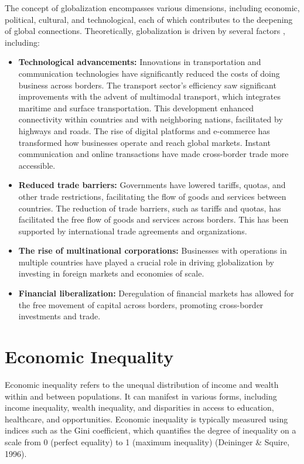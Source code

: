 The concept of globalization encompasses various dimensions, including economic, political, cultural, and technological, each of which contributes to the deepening of global connections. Theoretically, globalization is driven by several factors \citep{thompson2023factors}, including:
\begin{itemize}
    \item \textbf{Technological advancements:} Innovations in transportation and communication technologies have significantly reduced the costs of doing business across borders. The transport sector’s efficiency saw significant improvements with the advent of multimodal transport, which integrates maritime and surface transportation. This development enhanced connectivity within countries and with neighboring nations, facilitated by highways and roads. The rise of digital platforms and e-commerce has transformed how businesses operate and reach global markets. Instant communication and online transactions have made cross-border trade more accessible.
    \item \textbf{Reduced trade barriers:} Governments have lowered tariffs, quotas, and other trade restrictions, facilitating the flow of goods and services between countries. The reduction of trade barriers, such as tariffs and quotas, has facilitated the free flow of goods and services across borders. This has been supported by international trade agreements and organizations.
    \item \textbf{The rise of multinational corporations:} Businesses with operations in multiple countries have played a crucial role in driving globalization by investing in foreign markets and economies of scale.
    \item \textbf{Financial liberalization:} Deregulation of financial markets has allowed for the free movement of capital across borders, promoting cross-border investments and trade.
\end{itemize}

\section{Economic Inequality}\label{economicInequality}

Economic inequality refers to the unequal distribution of income and wealth within and between populations. It can manifest in various forms, including income inequality, wealth inequality, and disparities in access to education, healthcare, and opportunities. Economic inequality is typically measured using indices such as the Gini coefficient, which quantifies the degree of inequality on a scale from 0 (perfect equality) to 1 (maximum inequality) (Deininger \& Squire, 1996).

